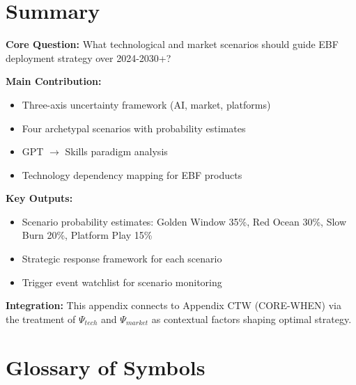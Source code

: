 \section{Summary}
\label{sec:vvv1-summary}

\begin{tcolorbox}[colback=green!10!white, colframe=green!75!black,
    title=\textbf{Appendix VVV.1: Summary}]

\textbf{Core Question:} What technological and market scenarios should guide
EBF deployment strategy over 2024-2030+?

\textbf{Main Contribution:}
\begin{itemize}[nosep]
    \item Three-axis uncertainty framework (AI, market, platforms)
    \item Four archetypal scenarios with probability estimates
    \item GPT $\to$ Skills paradigm analysis
    \item Technology dependency mapping for EBF products
\end{itemize}

\textbf{Key Outputs:}
\begin{itemize}[nosep]
    \item Scenario probability estimates: Golden Window 35\%, Red Ocean 30\%,
          Slow Burn 20\%, Platform Play 15\%
    \item Strategic response framework for each scenario
    \item Trigger event watchlist for scenario monitoring
\end{itemize}

\textbf{Integration:} This appendix connects to Appendix CTW (CORE-WHEN) via
the treatment of $\Psi_{tech}$ and $\Psi_{market}$ as contextual factors
shaping optimal strategy.

\end{tcolorbox}


\section{Glossary of Symbols}
\label{sec:vvv1-glossary}

